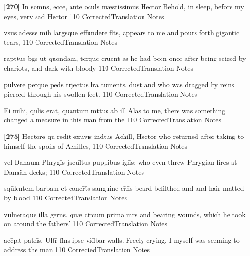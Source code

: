 \latline
  {\textbf{[270]} In somn\={\macron {\i}}s, ecce, ante ocul\={}s m{\ae}stissimus Hector}
  { Behold, in sleep, before my eyes,  very sad Hector   }
  {110}
  { CorrectedTranslation }
  { Notes }


\latline
  {v\={\macron {\i}}sus adesse mih\={\macron {\i}} larg\={}sque effundere fl\={}t\={}s,}
  { appears to me and pours forth gigantic tears, }
  {110}
  { CorrectedTranslation }
  { Notes }


\latline
  {rapt\={}tus b\={\macron {\i}}g\={\macron {\i}}s ut quondam, \={}terque cruent\={}}
  { as he had been once after being seized by chariots, and dark with bloody }
  {110}
  { CorrectedTranslation }
  { Notes }


\latline
  {pulvere perque ped\={}s tr\={}jectus l\={}ra tument\={\macron {\i}}s.}
  { dust and who was dragged by reins pierced through his swollen feet. }
  {110}
  { CorrectedTranslation }
  { Notes }


\latline
  {Ei mihi, qu\={}lis erat, quantum m\={}t\={}tus ab ill\={}}
  { Alas to me, there was something changed a measure in this man from the }
  {110}
  { CorrectedTranslation }
  { Notes }


\latline
  {\textbf{[275]} Hectore qu\={\macron {\i}} redit exuvi\={}s ind\={}tus Achill\={\macron {\i}},}
  { Hector who returned after taking to himself the spoils of Achilles, }
  {110}
  { CorrectedTranslation }
  { Notes }


\latline
  {vel Danaum Phrygi\={}s jacul\={}tus puppibus ign\={\macron {\i}}s;}
  { who even threw Phrygian fires at Dana\"an decks; }
  {110}
  { CorrectedTranslation }
  { Notes }


\latline
  {squ\={}lentem barbam et concr\={}t\={}s sanguine cr\={\macron {\i}}n\={\macron {\i}}s}
  { beard befilthed and and hair matted by blood }
  {110}
  { CorrectedTranslation }
  { Notes }


\latline
  {vulneraque illa ger\={}ns, qu{\ae} circum p\={}rima m\={}r\={}s}
  { and bearing wounds, which he took on around the fathers' }
  {110}
  { CorrectedTranslation }
  { Notes }


\latline
  {acc\={}pit patri\={}s.  Ultr\={} fl\={}ns ipse vid\={}bar}
  { walls.  Freely crying, I myself was seeming to address the man}
  {110}
  { CorrectedTranslation }
  { Notes }


